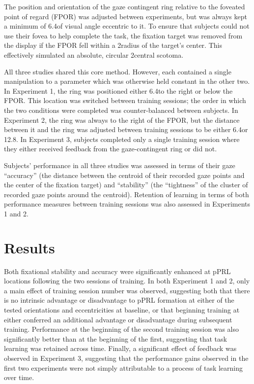 The position and orientation of the gaze contingent ring relative to the foveated point of regard (FPOR) was adjusted between experiments, but was always kept a minimum of 6.4\degree of visual angle eccentric to it. To ensure that subjects could not use their fovea to help complete the task, the fixation target was removed from the display if the FPOR fell within a 2\degree radius of the target's center. This effectively simulated an absolute, circular 2\degree central scotoma.

All three studies shared this core method. However, each contained a single manipulation to a parameter which was otherwise held constant in the other two. In Experiment 1, the ring was positioned either 6.4\degree to the right or below the FPOR. This location was switched between training sessions; the order in which the two conditions were completed was counter-balanced between subjects. In Experiment 2, the ring was always to the right of the FPOR, but the distance between it and the ring was adjusted between training sessions to be either 6.4\degree or 12.8\degree. In Experiment 3, subjects completed only a single training session where they either received feedback from the gaze-contingent ring or did not.

Subjects' performance in all three studies was assessed in terms of their gaze ``accuracy'' (the distance between the centroid of their recorded gaze points and the center of the fixation target) and ``stability'' (the ``tightness'' of the cluster of recorded gaze points around the centroid). Retention of learning in terms of both performance measures between training sessions was also assessed in Experiments 1 and 2.

\section*{Results}
Both fixational stability and accuracy were significantly enhanced at pPRL locations following the two sessions of training. In  both Experiment 1 and 2, only a main effect of training session number was observed, suggesting both that there is no intrinsic advantage or disadvantage to pPRL formation at either of the tested orientations and eccentricities at baseline, or that beginning training at either conferred an additional advantage or disadvantage during subsequent training. Performance at the beginning of the second training session was also significantly better than at the beginning of the first, suggesting that task learning was retained across time. Finally, a significant effect of feedback was observed in Experiment 3, suggesting that the performance gains observed in the first two experiments were not simply attributable to a process of task learning over time.  

